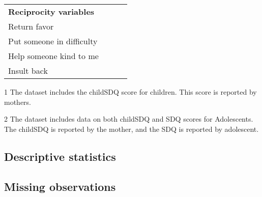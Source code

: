 \begin{table}[H]
\begin{center}
{\begin{threeparttable}
\begin{tabular}{L{5.5cm}C{2cm} C{2cm} C{2cm}}
		\textbf{Reciprocity variables}							&									&							&								\\
		\quad \quad Return favor								&									& \checkmark				& \checkmark					 \\
		\quad \quad Put someone in difficulty					&									& \checkmark				& \checkmark					 \\	
		\quad \quad Help someone kind to me					&									& \checkmark				& \checkmark					 \\
		\quad \quad Insult back								&									& \checkmark				& \checkmark					 \\

		
		\hline
		\end{tabular}

		\begin{tablenotes}
		\singlespace
		\footnotesize{
			\item [1] The dataset includes the childSDQ score for children. This score is reported by mothers. \\
			\item [2] The dataset includes data on both childSDQ and SDQ scores for Adolescents. The childSDQ is reported by the mother, and the SDQ is reported by adolescent.	
		}
		\end{tablenotes}
	\end{threeparttable}
	}
	\end{center}
\end{table}
\setcounter{footnote}{0}

 \clearpage

\begin{landscape}
\subsection{Descriptive statistics}

\end{landscape}

\begin{landscape}
\subsection{Missing observations}

\end{landscape}

